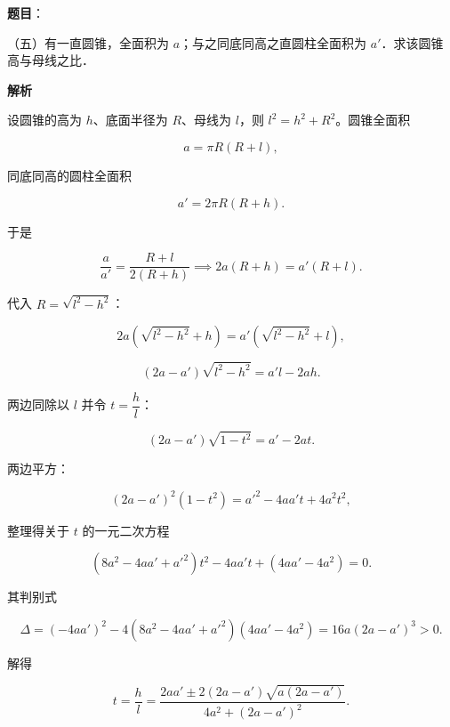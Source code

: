 \begin{answer}

\textbf{题目}：

（五）有一直圆锥，全面积为 $a$；与之同底同高之直圆柱全面积为 $a'$．求该圆锥高与母线之比．

\textbf{解析}

设圆锥的高为 $h$、底面半径为 $R$、母线为 $l$，则 $l^2=h^2+R^2$。圆锥全面积

\nopagebreak[4]
\[
a=\pi R(R+l),
\]

同底同高的圆柱全面积

\nopagebreak[4]
\[
a'=2\pi R(R+h).
\]

于是

\nopagebreak[4]
\[
\frac a{a'}=\frac{R+l}{2(R+h)}
\implies 2a(R+h)=a'(R+l).
\]

代入 $R=\sqrt{l^2-h^2}$：

\nopagebreak[4]
\[
2a\left(\sqrt{l^2-h^2}+h\right)=a'\left(\sqrt{l^2-h^2}+l\right),
\]

\nopagebreak[4]
\[
(2a-a')\sqrt{l^2-h^2}=a'l-2ah.
\]

两边同除以 $l$ 并令 $t=\dfrac hl$：

\nopagebreak[4]
\[
(2a-a')\sqrt{1-t^2}=a'-2at.
\]

两边平方：

\nopagebreak[4]
\[
(2a-a')^2(1-t^2)=a'^2-4aa't+4a^2t^2,
\]

整理得关于 $t$ 的一元二次方程

\nopagebreak[4]
\[
\left(8a^2-4aa'+a'^2\right)t^2-4aa't+\left(4aa'-4a^2\right)=0.
\]

其判别式

\nopagebreak[4]
\[
\Delta=(-4aa')^2-4(8a^2-4aa'+a'^2)(4aa'-4a^2)=16a(2a-a')^3>0.
\]

解得

\nopagebreak[4]
\[
t=\frac hl=\frac{2aa'\pm2(2a-a')\sqrt{a(2a-a')}}{4a^2+(2a-a')^2}.
\]


\end{answer}